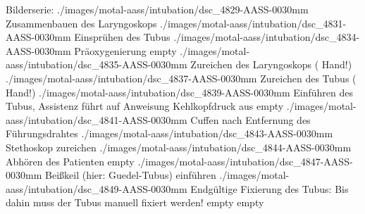 \documentclass[
ngerman,
paper=a4,
asymmetric,
fontsize=8pt,
draft=false,
numbers=noenddot,
bibtotocnumbered,
footnotes=multiple,
toc=flat,
]{scrbook}
\begin{document}

\begin{PictureSeriesWide}{}{Bilderserie:  }
{./images/motal-aass/intubation/dsc_4829-AASS-0030mm}
{Zusammenbauen des Laryngoskops}
{./images/motal-aass/intubation/dsc_4831-AASS-0030mm}
{Einsprühen des Tubus }
{./images/motal-aass/intubation/dsc_4834-AASS-0030mm}
{Präoxygenierung}
{empty}
{}
{./images/motal-aass/intubation/dsc_4835-AASS-0030mm}
{Zureichen des Laryngoskops ( Hand!)}
{./images/motal-aass/intubation/dsc_4837-AASS-0030mm}
{Zureichen des Tubus ( Hand!)}
{./images/motal-aass/intubation/dsc_4839-AASS-0030mm}
{Einführen des Tubus, Assistenz führt auf Anweisung Kehlkopfdruck aus}
{empty}
{}
{./images/motal-aass/intubation/dsc_4841-AASS-0030mm}
{Cuffen nach Entfernung des Führungsdrahtes}
{./images/motal-aass/intubation/dsc_4843-AASS-0030mm}
{Stethoskop zureichen}
{./images/motal-aass/intubation/dsc_4844-AASS-0030mm}
{Abhören des Patienten}
{empty}
{}
{./images/motal-aass/intubation/dsc_4847-AASS-0030mm}
{Beißkeil (hier: Guedel-Tubus) einführen}
{./images/motal-aass/intubation/dsc_4849-AASS-0030mm}
{Endgültige Fixierung des Tubus: Bis dahin muss der Tubus manuell fixiert werden!}
{empty}
{}
{empty}
{}
\end{PictureSeriesWide}
\end{document}
